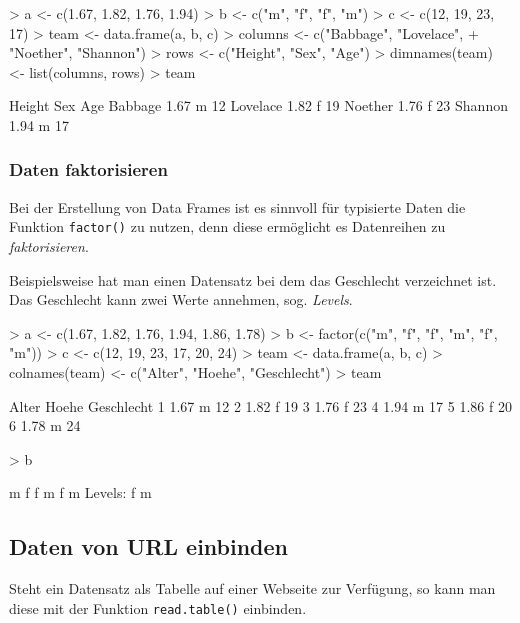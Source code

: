 \begin{Schunk}
\begin{Sinput}
> a <- c(1.67, 1.82, 1.76, 1.94)
> b <- c("m", "f", "f", "m")
> c <- c(12, 19, 23, 17)
> team <- data.frame(a, b, c)
> columns <- c("Babbage", "Lovelace", 
+ 	     "Noether", "Shannon")
> rows <- c("Height", "Sex", "Age")
> dimnames(team) <- list(columns, rows)
> team
\end{Sinput}
\begin{Soutput}
         Height Sex Age
Babbage    1.67   m  12
Lovelace   1.82   f  19
Noether    1.76   f  23
Shannon    1.94   m  17
\end{Soutput}
\end{Schunk}

\subsubsection{Daten faktorisieren}
Bei der Erstellung von Data Frames ist es sinnvoll für typisierte
Daten die Funktion \lstinline{factor()} zu nutzen, denn diese 
ermöglicht es Datenreihen zu \emph{faktorisieren}. 

Beispielsweise hat man einen Datensatz bei dem das Geschlecht 
verzeichnet ist. Das Geschlecht kann zwei Werte annehmen, sog. 
\emph{Levels}.

\begin{Schunk}
\begin{Sinput}
> a <- c(1.67, 1.82, 1.76, 1.94, 1.86, 1.78)
> b <- factor(c("m", "f", "f", "m", "f", "m"))
> c <- c(12, 19, 23, 17, 20, 24)
> team <- data.frame(a, b, c)
> colnames(team) <- c("Alter", "Hoehe", "Geschlecht")
> team
\end{Sinput}
\begin{Soutput}
  Alter Hoehe Geschlecht
1  1.67     m         12
2  1.82     f         19
3  1.76     f         23
4  1.94     m         17
5  1.86     f         20
6  1.78     m         24
\end{Soutput}
\begin{Sinput}
> b
\end{Sinput}
\begin{Soutput}
[1] m f f m f m
Levels: f m
\end{Soutput}
\end{Schunk}

\subsection{Daten von URL einbinden}
Steht ein Datensatz als Tabelle auf einer Webseite zur Verfügung,
so kann man diese mit der Funktion \lstinline{read.table()} einbinden.

